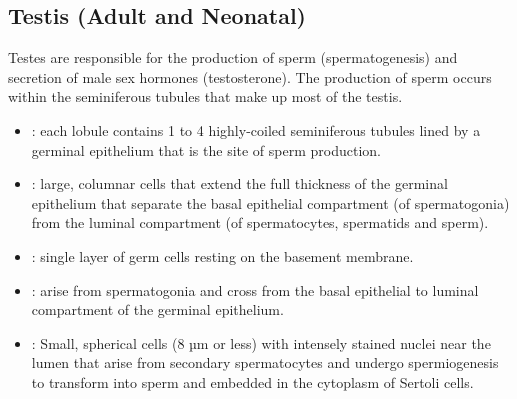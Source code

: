 \subsection{Testis (Adult and Neonatal)}
Testes are responsible for the production of sperm (spermatogenesis) and secretion of male sex hormones (testosterone). The production of sperm occurs within the seminiferous tubules that make up most of the testis.
\begin{center}
\end{center}
\begin{multicols}{2}
\begin{itemize}
  \item {}:  each lobule contains 1 to 4 highly-coiled seminiferous tubules lined by a germinal epithelium that is the site of sperm production. 
  
  \begin{center}
  \end{center}
  
  \item {}: large, columnar cells that extend the full thickness of the germinal epithelium that separate the basal epithelial compartment (of spermatogonia) from the luminal compartment (of spermatocytes, spermatids and sperm).
  
  \begin{center}
  \end{center}
  
  \item {}: single layer of germ cells resting on the basement membrane.
  
  \begin{center}
  \end{center}
  
  \item {}: arise from spermatogonia and cross from the basal epithelial to luminal compartment of the germinal epithelium.
  
  \begin{center}
  \end{center}
  
  \item {}: Small, spherical cells (8 µm or less) with intensely stained nuclei near the lumen that arise from secondary spermatocytes and undergo spermiogenesis to transform into sperm and embedded in the cytoplasm of Sertoli cells.
  

\end{itemize}
\end{multicols}
